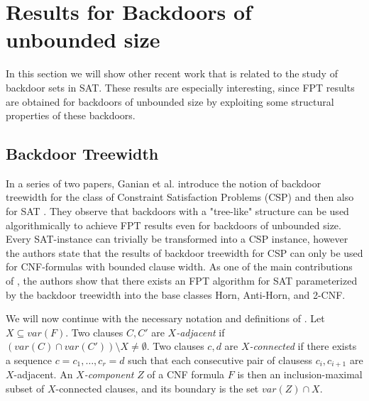 \documentclass[11pt,a4paper]{article}
\theoremstyle{definition}
\theoremstyle{proposition}
\begin{document}
\section{Results for Backdoors of unbounded size}
\label{sec:unboundedbackdoors}

In this section we will show other recent work that is related to the study of backdoor sets in SAT. These results are especially interesting, since FPT results are obtained for backdoors of unbounded size by exploiting some structural properties of these backdoors. 

\subsection{Backdoor Treewidth}

In a series of two papers, Ganian et al. introduce the notion of backdoor treewidth for the class of Constraint Satisfaction Problems (CSP) \cite{GanianCSP} and then also for SAT \cite{GanianBackdoorTreewidth}. They observe that backdoors with a "tree-like" structure can be used algorithmically to achieve FPT results even for backdoors of unbounded size. Every SAT-instance can trivially be transformed into a CSP instance, however the authors state that the results of backdoor treewidth for CSP can only be used for CNF-formulas with bounded clause width. As one of the main contributions of \cite{GanianBackdoorTreewidth}, the authors show that there exists an FPT algorithm for SAT parameterized by the backdoor treewidth into the base classes Horn, Anti-Horn, and 2-CNF.

We will now continue with the necessary notation and definitions of \cite{GanianBackdoorTreewidth}. 
Let $X \subseteq var(F)$. Two clauses $C,C'$ are \textit{$X$-adjacent} if $(var(C) \cap var(C')) \setminus X \neq \emptyset$. Two clauses $c,d$ are \textit{$X$-connected} if there exists a sequence $c=c_1, \dots , c_r = d$ such that each consecutive pair of clausess $c_i, c_{i+1}$ are $X$-adjacent. An \textit{$X$-component} $Z$ of a CNF formula $F$ is then an inclusion-maximal subset of $X$-connected clauses, and its boundary is the set $var(Z) \cap X$. 
\end{document}
